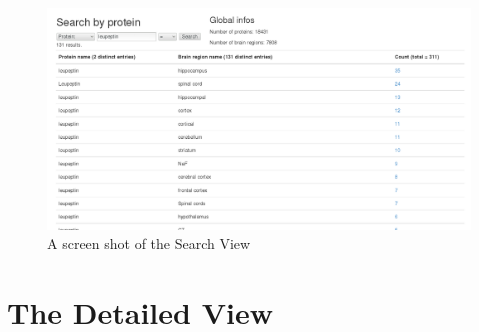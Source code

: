 \documentclass{report}
\begin{document}
			\begin{figure}[h]
				\includegraphics[width=\textwidth]{fig/search_view_screenshot.png}
				\caption{A screen shot of the Search View}
				\label{fig:search_view}
			\end{figure}
			
			\section{The Detailed View}
			
\end{document}
